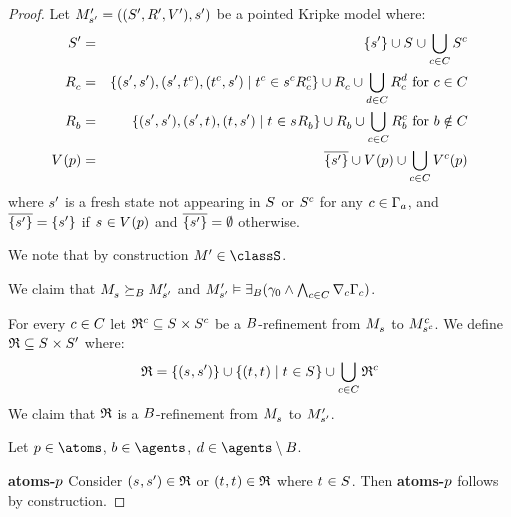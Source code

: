 \begin{proof}
Let $\kPModelAndTupleP{\kStateSP}$ be a pointed Kripke model where:
\begin{eqnarray*}
    \kStatesP &=& \{\kStateSP\} \cup \kStates \cup \bigcup_{\agentC \in \agentsC} \kStates[\agentC]\\
    \kAccessibilityC &=& \{(\kStateSP, \kStateSP), (\kStateSP, \kStateT[\agentC]), (\kStateT[\agentC], \kStateSP) \mid \kStateT[\agentC] \in \kSuccessorsC[\agentC]{\kStateS[\agentC]}\} \cup \kAccessibilityC \cup \bigcup_{\agentD \in \agentsC} \kAccessibilityC[\agentD] \text{ for } \agentC \in \agentsC\\
    \kAccessibilityB &=& \{(\kStateSP, \kStateSP), (\kStateSP, \kStateT), (\kStateT, \kStateSP) \mid \kStateT \in \kSuccessorsB{\kStateS}\} \cup \kAccessibilityB \cup \bigcup_{\agentC \in \agentsC} \kAccessibilityB[\agentC] \text{ for } \agentB \notin \agentsC\\
    \kValuation(\atomP) &=& \overline{\{\kStateSP\}} \cup \kValuation(\atomP) \cup \bigcup_{\agentC \in \agentsC} \kValuation[\agentC](\atomP)
\end{eqnarray*}
where $\kStateSP$ is a fresh state not appearing in $\kStates$ or $\kStates[\agentC]$ for any $\agentC \in \Gamma_\agentA$, and $\overline{\{\kStateSP\}} = \{\kStateSP\}$ if $\kStateS \in \kValuation(\atomP)$ and $\overline{\{\kStateSP\}} = \emptyset$ otherwise.

We note that by construction $\kModelP \in \classS$.

We claim that $\kPModel{\kStateS} \simulatesBs \kPModelP{\kStateSP}$ and $\kPModelP{\kStateSP} \entails \somerefsBs (\gamma_0 \land \bigwedge_{\agentC \in \agentsC} \coversC \Gamma_\agentC)$.

For every $\agentC \in \agentsC$ let $\refinement^\agentC \subseteq \kStates \times \kStates[\agentC]$ be a $\agentsB$-refinement from $\kPModel{\kStateS}$ to $\kPModel[\agentC]{\kStateS[\agentC]}$.
We define $\refinement \subseteq \kStates \times \kStatesP$ where:
$$
\refinement = \{(\kStateS, \kStateSP)\} \cup \{(\kStateT, \kStateT) \mid \kStateT \in \kStates\} \cup \bigcup_{\agentC \in \agentsC} \refinement^\agentC
$$
We claim that $\refinement$ is a $\agentsB$-refinement from $\kPModel{\kStateS}$ to $\kPModelP{\kStateSP}$.

Let $\atomP \in \atoms$, $\agentB \in \agents$, $\agentD \in \agents \setminus \agentsB$.

{\bf atoms-$\atomP$}
Consider $(\kStateS, \kStateSP) \in \refinement$ or $(\kStateT, \kStateT) \in \refinement$ where $\kStateT \in \kStates$.
Then {\bf atoms-$\atomP$} follows by construction.


\end{proof}
